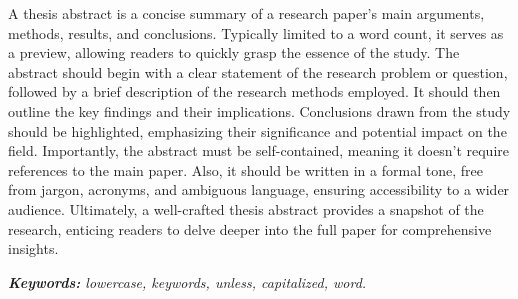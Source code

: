 A thesis abstract is a concise summary of a research paper's main arguments, methods, results, and conclusions. Typically limited to a word count, it serves as a preview, allowing readers to quickly grasp the essence of the study. The abstract should begin with a clear statement of the research problem or question, followed by a brief description of the research methods employed. It should then outline the key findings and their implications. Conclusions drawn from the study should be highlighted, emphasizing their significance and potential impact on the field. Importantly, the abstract must be self-contained, meaning it doesn't require references to the main paper. Also, it should be written in a formal tone, free from jargon, acronyms, and ambiguous language, ensuring accessibility to a wider audience. Ultimately, a well-crafted thesis abstract provides a snapshot of the research, enticing readers to delve deeper into the full paper for comprehensive insights.

\bigskip
\textit{\textbf{Keywords:} lowercase, keywords, unless, capitalized, word.}